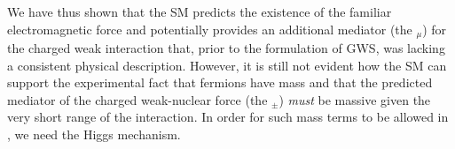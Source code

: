 We have thus shown that the SM predicts the existence of the familiar electromagnetic force
and potentially provides an additional mediator (the \fieldWpm$_{\mu}$) for the charged weak interaction that, prior to the
formulation of GWS, was lacking a consistent physical description. However, it is still
not evident how the SM can support the experimental fact that fermions have mass and that
the predicted mediator of the charged weak-nuclear force (the \fieldWpm$_{\pm}$) \textit{must}
be massive given the very short range of the interaction. In order for such mass terms to
be allowed in \SML, we need the Higgs mechanism.

